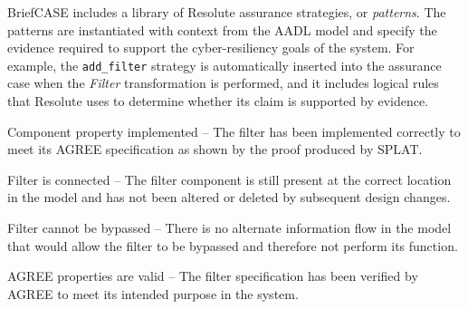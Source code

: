BriefCASE includes a library of Resolute assurance strategies, or \emph{patterns}.
The patterns are instantiated with context from the AADL model and specify the evidence required to support the cyber-resiliency goals of the system.
For example, the \texttt{add\_filter} strategy is automatically inserted into the assurance case when the
\textit{Filter} transformation is performed, and it includes logical rules that Resolute uses to
determine whether its claim is supported by evidence.
\begin{compactitem} 
\item Component property implemented -- The filter has been implemented correctly 
to meet its AGREE specification as shown by the proof produced by SPLAT.
\item Filter is connected -- The filter component is still present at the correct location in the model and has not been altered or deleted by subsequent design changes. 
\item Filter cannot be bypassed -- There is no alternate information flow in the model that 
would allow the filter to be bypassed and therefore not perform its function.   
\item AGREE properties are valid -- The filter specification has been verified by AGREE to meet its
intended purpose in the system.   
\end{compactitem}